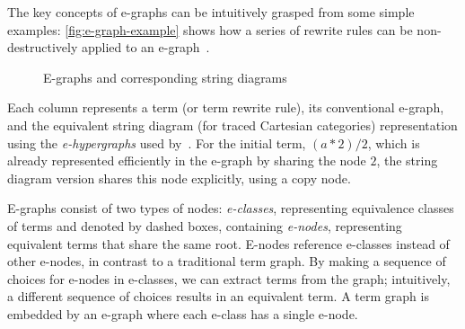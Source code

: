 \documentclass[manuscript, nonacm, anonymous]{acmart}
\begin{document}
The key concepts of e-graphs can be intuitively grasped from some simple examples: \autoref{fig:e-graph-example} shows how a series of rewrite rules can be non-destructively applied to an e-graph~\cite{EggPaper}.

\begin{figure}[t!]
	\centering
  \caption{E-graphs and corresponding string diagrams~\cite{tiurin2025equivalencehypergraphsdporewriting}}
  \label{fig:e-graph-example}
\end{figure}

Each column represents a term (or term rewrite rule), its conventional e-graph, and the equivalent string diagram (for traced Cartesian categories) representation using the \emph{e-hypergraphs} used by~\citet{tiurin2025equivalencehypergraphsdporewriting}.
For the initial term, $(a*2)/2$, which is already represented efficiently in the e-graph by sharing the node $2$, the string diagram version shares this node explicitly, using a copy node.

E-graphs consist of two types of nodes: \emph{e-classes}, representing equivalence classes of terms and denoted by dashed boxes, containing \emph{e-nodes}, representing equivalent terms that share the same root.
E-nodes reference e-classes instead of other e-nodes, in contrast to a traditional term graph.
By making a sequence of choices for e-nodes in e-classes, we can extract terms from the graph; intuitively, a different sequence of choices results in an equivalent term.
A term graph is embedded by an e-graph where each e-class has a single e-node.
\end{document}
